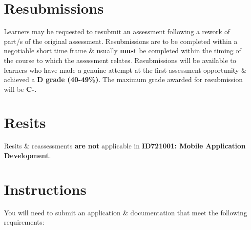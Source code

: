 \documentclass{article}
\begin{document}
\section*{Resubmissions}
Learners may be requested to resubmit an assessment following a rework of part/s of the original assessment. Resubmissions are to be completed within a negotiable short time frame \& usually \textbf{must} be completed within the timing of the course to which the assessment relates. Resubmissions will be available to learners who have made a genuine attempt at the first assessment opportunity \& achieved a \textbf{D grade (40-49\%)}. The maximum grade awarded for resubmission will be \textbf{C-}.

\section*{Resits}
Resits \& reassessments \textbf{are not} applicable in \textbf{ID721001: Mobile Application Development}.

\section*{Instructions}
You will need to submit an application \& documentation that meet the following requirements:
\end{document}
